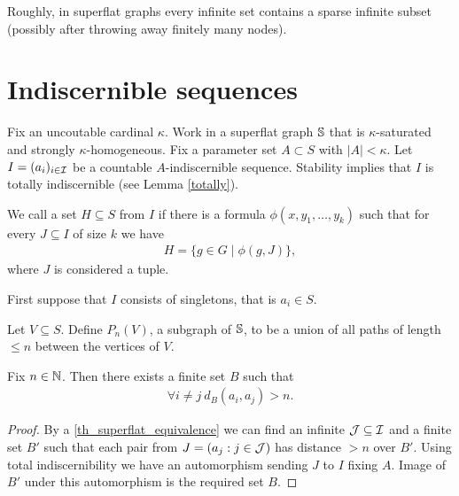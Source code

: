 Roughly, in superflat graphs every infinite set contains a sparse infinite subset (possibly after throwing away finitely many nodes).

\section{Indiscernible sequences}

Fix an uncoutable cardinal $\kappa$.
Work in a superflat graph $\mathbb S$ that is $\kappa$-saturated and strongly $\kappa$-homogeneous.
Fix a parameter set $A \subset S$ with $|A| < \kappa$.
Let $I = (a_i)_{i \in \operatorname{\mathcal I}}$ be a countable $A$-indiscernible sequence.%
Stability implies that $I$ is totally indiscernible (see Lemma \ref{totally}).

\begin{Definition}
  We call a set $H \subseteq S$  from $I$ if there
  is a formula $\phi(x, y_1, \ldots, y_k)$ such that for every $J \subseteq I$ of size $k$ we have
  \begin{align*}
    H = \{g \in G \mid \phi(g, J)\},
  \end{align*}
  where $J$ is considered a tuple.
\end{Definition}

First suppose that $I$ consists of singletons, that is $a_i \in S$.

\begin{Definition}
  Let $V \subseteq S$. Define $P_n(V)$, a subgraph of $\mathbb S$, to be a union of all paths of length $\leq n$ between the vertices of $V$.
\end{Definition}

\begin{Lemma} \label{lm_bump}
  Fix $n \in \mathbb{N}$.
  Then there exists a finite set $B$ such that
  \begin{align*}
    \forall i \neq j \ d_B(a_i, a_j) > n.
  \end{align*}
\end{Lemma}

\begin{proof}
  By a \ref{th_superflat_equivalence} we can find an infinite $\operatorname{\mathcal J} \subseteq \operatorname{\mathcal I}$ and a finite set $B'$
  such that each pair from $J = (a_j : j \in \operatorname{\mathcal J})$ has distance $>n$ over $B'$.
  Using total indiscernibility we have an automorphism sending $J$ to $I$ fixing $A$.
  Image of $B'$ under this automorphism is the required set $B$.
\end{proof}

